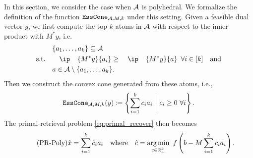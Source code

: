 In this section, we consider the case when $\mathcal{A}$ is polyhedral. We formalize the definition of the function $\texttt{EssCone}_{\mathcal{A}, M, k}$ under this setting. Given a feasible dual vector $y$, we first compute the top-$k$ atoms in $\mathcal{A}$ with respect to the inner product with $M^*y$, i.e. 
\begin{equation} \label{eq:top-k}
  \begin{split}
                & \{a_1, \dots, a_k\} \subseteq \Ascr \\
    \text{s.t.} & \ip{M^*y}{a_i} \geq \ip{M^*y}{a} \enspace\forall i \in [k] \text{and}\\
                & a \in \Ascr\setminus\{a_1, \dots, a_k\}.
  \end{split}
\end{equation}
Then we construct the convex cone generated from these atoms, i.e., 
\[\texttt{EssCone}_{\mathcal{A}, M, k}(y) \coloneqq \left\{\sum_{i=1}^k c_i a_i ~\bigg\vert~ c_i \geq 0 ~\forall i\right\}.\]
The primal-retrieval problem \eqref{eq:primal_recover} then becomes
\begin{equation} \label{eq:primal_recover_polyhedral} \tag{PR-Poly}
\hat x = \sum_{i=1}^k \hat c_ia_i \hbox{\quad where\quad} \hat c = \underset{c \in \mathbb{R}^k_+}{\textrm{arg}\,{\min}}\enskip f\left( b - M\sum_{i=1}^k c_ia_i \right). 
\end{equation}

